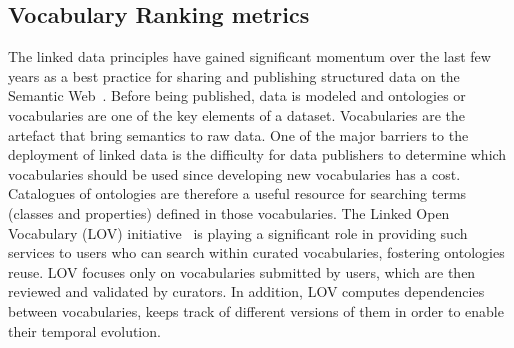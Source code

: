\begin{description}
\begin{table}
\end{table}


\section{Vocabulary Ranking metrics}
\label{sec:vocabranking}

\label{sec:introduction}
The linked data principles have gained significant momentum over the last few years as a best practice for sharing and publishing structured data on the Semantic Web~\cite{Bizer2009}. Before being published, data is modeled and ontologies or vocabularies are one of the key elements of a dataset. Vocabularies are the artefact that bring semantics to raw data. One of the major barriers to the deployment of linked data is the difficulty for data publishers to determine which vocabularies should be used since developing new vocabularies has a cost. Catalogues of ontologies are therefore a useful resource for searching terms (classes and properties) defined in those vocabularies. The Linked Open Vocabulary (LOV) initiative~\cite{scharffe_2012} is playing a significant role in providing such services to users who can search within curated vocabularies, fostering ontologies reuse. LOV focuses only on vocabularies submitted by users, which are then reviewed and validated by curators. In addition, LOV computes dependencies between vocabularies, keeps track of different versions of them in order to enable their temporal evolution.


\end{description}
